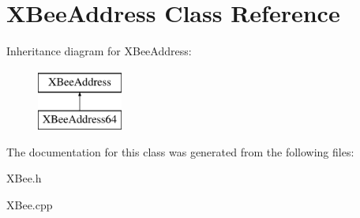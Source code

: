 \hypertarget{classXBeeAddress}{\section{\-X\-Bee\-Address \-Class \-Reference}
\label{classXBeeAddress}
}
\-Inheritance diagram for \-X\-Bee\-Address\-:\begin{figure}[H]
\begin{center}
\leavevmode
\includegraphics[height=2.000000cm]{classXBeeAddress}
\end{center}
\end{figure}


\-The documentation for this class was generated from the following files\-:\begin{DoxyCompactItemize}
\item 
\-X\-Bee.\-h\item 
\-X\-Bee.\-cpp\end{DoxyCompactItemize}
